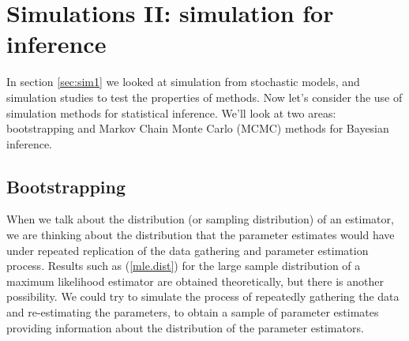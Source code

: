 \documentclass[10pt] {article}
\theoremstyle{definition}
\begin{document}
\section{Simulations II: simulation for inference}

In section \ref{sec:sim1} we looked at simulation from stochastic models, and simulation studies to test the properties of methods. Now let's consider the use of simulation methods for statistical inference. We'll look at two areas: bootstrapping and Markov Chain Monte Carlo (MCMC) methods for Bayesian inference.

\subsection{Bootstrapping}

When we talk about the distribution (or sampling distribution) of an estimator, we are thinking about the distribution that the parameter estimates would have under repeated replication of the data gathering and parameter estimation process. Results such as (\ref{mle.dist}) for the large sample distribution of a maximum likelihood estimator are obtained theoretically, but there is another possibility. We could try to simulate the process of repeatedly gathering the data and re-estimating the parameters, to obtain a sample of parameter estimates providing information about the distribution of the parameter estimators. 
\end{document}
